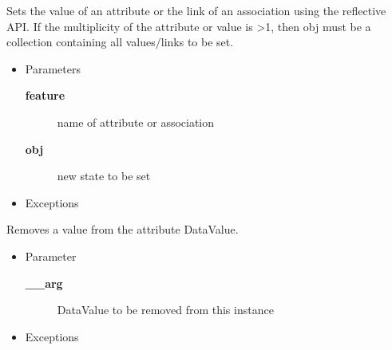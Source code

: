 \begin{desc}Sets the value of an attribute or the link of an association using the
 reflective API. If the multiplicity of the attribute or value is \textgreater  1,
 then obj must be a collection containing all values$/$links to be set.
\begin{itemize}
\item{Parameters
  \begin{description}
   \item[{\bf feature}]{name of attribute or association}
   \item[{\bf obj}]{new state to be set}
  \end{description}}
\end{itemize}
\begin{itemize}
\item{{Exceptions}
}
\end{itemize}
\end{desc}

\begin{desc}Removes a value from the attribute DataValue.
\begin{itemize}
\item{Parameter
  \begin{description}
   \item[{\bf \_\_arg}]{DataValue to be removed from this instance}
  \end{description}}
\end{itemize}
\begin{itemize}
\item{{Exceptions}
}
\end{itemize}
\end{desc}

